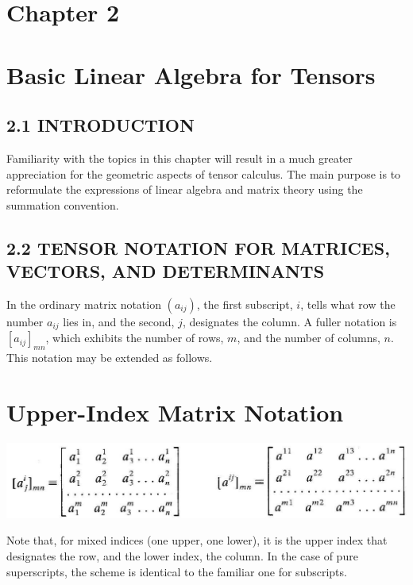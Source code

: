 \documentclass[10pt]{article}
\begin{document}
\section*{Chapter 2}
\section*{Basic Linear Algebra for Tensors}
\subsection*{2.1 INTRODUCTION}
Familiarity with the topics in this chapter will result in a much greater appreciation for the geometric aspects of tensor calculus. The main purpose is to reformulate the expressions of linear algebra and matrix theory using the summation convention.

\subsection*{2.2 TENSOR NOTATION FOR MATRICES, VECTORS, AND DETERMINANTS}
In the ordinary matrix notation $\left(a_{i j}\right)$, the first subscript, $i$, tells what row the number $a_{i j}$ lies in, and the second, $j$, designates the column. A fuller notation is $\left[a_{i j}\right]_{m n}$, which exhibits the number of rows, $m$, and the number of columns, $n$. This notation may be extended as follows.

\section*{Upper-Index Matrix Notation}
\begin{center}
\includegraphics[max width=\textwidth]{2024_04_03_41f90be4f896e21f0dc9g-017}
\end{center}

Note that, for mixed indices (one upper, one lower), it is the upper index that designates the row, and the lower index, the column. In the case of pure superscripts, the scheme is identical to the familiar one for subscripts.
\end{document}
